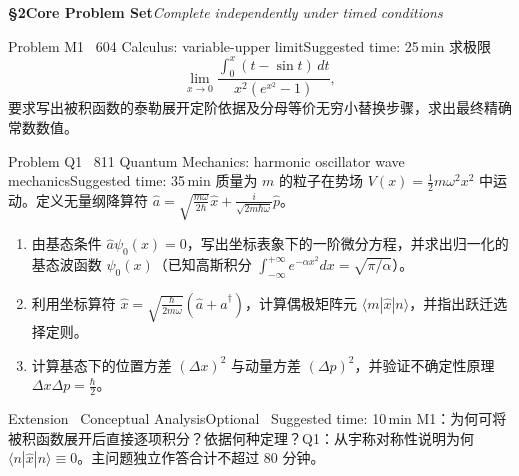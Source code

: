 \documentclass[a4paper,11pt]{article}
\begin{document}
\clearpage

{\Large\sffamily\bfseries\color{navy} \S 2\quad Core Problem Set}\hfill{\small\sffamily\color{mist}\itshape Complete independently under timed conditions}

\vspace{8pt}

\begin{problem}{Problem M1 \textbar\ 604 Calculus: variable-upper limit}{Suggested time: 25\,min}
求极限
\[
  \lim_{x\to 0}\frac{\displaystyle\int_0^x (t-\sin t)\,dt}{x^2 (e^{x^2}-1)},
\]
要求写出被积函数的泰勒展开定阶依据及分母等价无穷小替换步骤，求出最终精确常数数值。
\end{problem}

\vspace{6pt}

\begin{problem}{Problem Q1 \textbar\ 811 Quantum Mechanics: harmonic oscillator wave mechanics}{Suggested time: 35\,min}
质量为 $m$ 的粒子在势场 $V(x)=\frac{1}{2}m\omega^2 x^2$ 中运动。定义无量纲降算符 $\hat{a} = \sqrt{\frac{m\omega}{2\hbar}}\hat{x} + \frac{i}{\sqrt{2m\hbar\omega}}\hat{p}$。
\begin{enumerate}[leftmargin=1.6em,itemsep=2pt,topsep=2pt]
  \item 由基态条件 $\hat{a}\psi_0(x) = 0$，写出坐标表象下的一阶微分方程，并求出归一化的基态波函数 $\psi_0(x)$（已知高斯积分 $\int_{-\infty}^{+\infty} e^{-\alpha x^2}dx = \sqrt{\pi/\alpha}$）。
  \item 利用坐标算符 $\hat{x} = \sqrt{\frac{\hbar}{2m\omega}}(\hat{a}+\hat{a}^\dagger)$，计算偶极矩阵元 $\langle m|\hat{x}|n\rangle$，并指出跃迁选择定则。
  \item 计算基态下的位置方差 $(\Delta x)^2$ 与动量方差 $(\Delta p)^2$，并验证不确定性原理 $\Delta x \Delta p = \frac{\hbar}{2}$。
\end{enumerate}
\end{problem}

\vspace{6pt}

\begin{problem}{Extension \textbar\ Conceptual Analysis}{Optional \textperiodcentered\ Suggested time: 10\,min}
M1：为何可将被积函数展开后直接逐项积分？依据何种定理？Q1：从宇称对称性说明为何 $\langle n|\hat{x}|n\rangle \equiv 0$。主问题独立作答合计不超过 80 分钟。
\end{problem}
\end{document}
